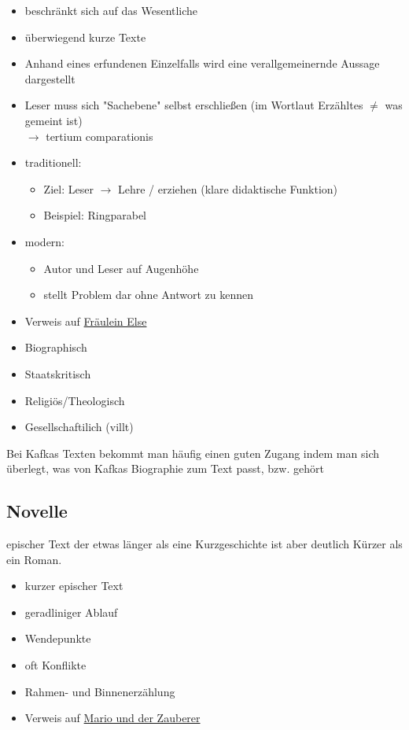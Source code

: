 \begin{itemize}
    \item beschränkt sich auf das Wesentliche
    \item überwiegend kurze Texte
    \item Anhand eines erfundenen Einzelfalls wird eine verallgemeinernde Aussage dargestellt
    \item Leser muss sich "Sachebene" selbst erschließen (im Wortlaut Erzähltes $\neq$ was gemeint ist) \\
    $\rightarrow$ tertium comparationis
    \item traditionell:
    \begin{itemize}
        \item Ziel: Leser $\rightarrow$ Lehre / erziehen (klare didaktische Funktion)
        \item Beispiel: Ringparabel
    \end{itemize}
    \item modern:
    \begin{itemize}
        \item Autor und Leser auf Augenhöhe
        \item stellt Problem dar ohne Antwort zu kennen
    \end{itemize}
    \item Verweis auf \hyperref[sec:frauleinelse]{Fräulein Else}
\end{itemize}

\begin{itemize}
    \item Biographisch
    \item Staatskritisch
    \item Religiös/Theologisch
    \item Gesellschaftilich (villt)
\end{itemize}

 Bei Kafkas Texten bekommt man häufig einen guten Zugang indem man sich überlegt, was von Kafkas Biographie zum Text passt, bzw. gehört


\subsection{Novelle}

 epischer Text der etwas länger als eine Kurzgeschichte ist aber deutlich Kürzer als ein Roman.

\begin{itemize}
    \item kurzer epischer Text
    \item geradliniger Ablauf
    \item Wendepunkte
    \item oft Konflikte
    \item Rahmen- und Binnenerzählung
    \item Verweis auf \hyperref[sec:mario]{Mario und der Zauberer}
\end{itemize}
